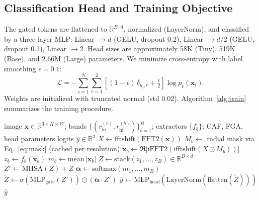 \documentclass[journal]{IEEEtran}
\begin{document}
\subsection{Classification Head and Training Objective}
The gated tokens are flattened to $\mathbb{R}^{B \cdot d}$, normalized (LayerNorm), and classified by a three-layer MLP: Linear $\rightarrow d$ (GELU, dropout 0.2), Linear $\rightarrow d/2$ (GELU, dropout 0.1), Linear $\rightarrow 2$. Head sizes are approximately 58K (Tiny), 519K (Base), and 2.66M (Large) parameters. We minimize cross-entropy with label smoothing $\epsilon = 0.1$:
\begin{equation}
\mathcal{L} = -\sum_{i=1}^N \sum_{c=1}^2 \left[(1-\epsilon)\,\delta_{y_i,c} + \tfrac{\epsilon}{2}\right] \log p_c(\mathbf{x}_i).
\label{eq:loss}
\end{equation}
Weights are initialized with truncated normal (std 0.02). Algorithm~\ref{alg:train} summarizes the training procedure.

\begin{algorithm}[!t]
\caption{MFFT forward pass}
\label{alg:forward}
\begin{algorithmic}[1]
\REQUIRE image $\mathbf{x}\in\mathbb{R}^{3\times H\times W}$; bands $\{(r_{\mathrm{lo}}^{(b)}, r_{\mathrm{hi}}^{(b)})\}_{b=1}^{B}$; extractors $\{f_b\}$; CAF, FGA, head parameters
\ENSURE logits $\hat{y}\in\mathbb{R}^{2}$
\STATE $X \leftarrow \mathrm{fftshift}(\mathrm{FFT2}(\mathbf{x}))$ 
    \STATE $M_b \leftarrow$ radial mask via Eq.~\eqref{eq:mask} (cached per resolution)
    \STATE $\mathbf{x}_b \leftarrow \Re\big[\mathrm{iFFT2}(\mathrm{ifftshift}(X \odot M_b))\big]$ 
    \STATE $z_b \leftarrow f_b(\mathbf{x}_b)$ 
    \STATE $m_b \leftarrow \mathrm{mean}\,|\mathbf{x}_b|$ 
\ENDFOR
\STATE $Z \leftarrow \mathrm{stack}(z_1,\dots,z_B) \in \mathbb{R}^{B\times d}$
\STATE $Z' \leftarrow \mathrm{MHSA}(Z) + Z$ 
\STATE $\boldsymbol{\alpha} \leftarrow \mathrm{softmax}(m_1,\dots,m_B)$
\STATE $\tilde{Z} \leftarrow \sigma(\mathrm{MLP}_{\mathrm{gate}}(Z')) \odot (\boldsymbol{\alpha}\cdot Z')$ 
\STATE $\hat{y} \leftarrow \mathrm{MLP}_{\mathrm{head}}(\mathrm{LayerNorm}(\mathrm{flatten}(\tilde{Z})))$
\RETURN $\hat{y}$
\end{algorithmic}
\end{algorithm}
\end{document}
